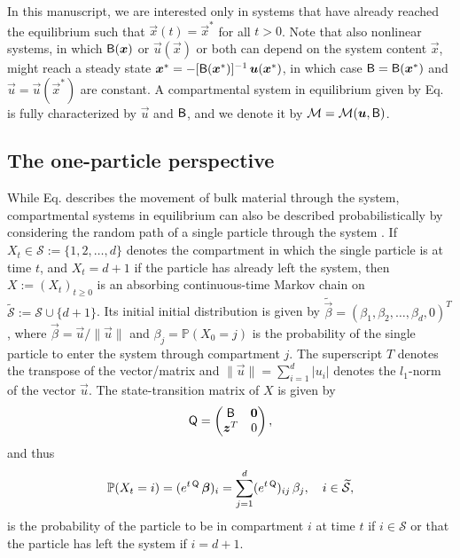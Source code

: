 \documentclass[smallextended]{svjour3}
\makeatletter
\renewcommand*{\eqref}[1]{%
  \hyperref[{#1}]{\textup{\tagform@{\ref*{#1}}}}%
}
\renewcommand{\P}{\mathbb{P}}
\newcommand{\suml}{\sum\limits}
\newcommand{\vnorms}[1]{\|#1\|}
\makeatother
\begin{document}
In this manuscript, we are interested only in systems that have already reached the equilibrium such that $\vec{x}(t)=\vec{x}^\ast$ for all $t>0$.
Note that also nonlinear systems, in which $\tens{B}(\vec{x})$ or $\vec{u}(\vec{x})$ or both can depend on the system content $\vec{x}$, might reach a steady state $\vec{x}^\ast = -[\tens{B}(\vec{x}^\ast)]^{-1}\,\vec{u}(\vec{x}^\ast)$, in which case $\tens{B}=\tens{B}(\vec{x}^\ast)$ and $\vec{u}=\vec{u}(\vec{x}^\ast)$ are constant.
A compartmental system in equilibrium given by Eq. \eqref{eqn:lin_CS_sys} is fully characterized by $\vec{u}$ and $\mathsf{B}$, and we denote it by $\mathcal{M}=\mathcal{M}(\vec{u},\tens{B})$.


\subsection{The one-particle perspective}
\label{sec:the_one_particle_perspective}
While Eq. \eqref{eqn:lin_CS_sys} describes the movement of bulk material through the system, compartmental systems in equilibrium can also be described probabilistically by considering the random path of a single particle through the system \citep{Metzler2018MGS}.
If $X_t\in\mathcal{S}:=\{1,2,\ldots,d\}$ denotes the compartment in which the single particle is at time $t$, and $X_t=d+1$ if the particle has already left the system, then $X:=(X_t)_{t\geq0}$ is an absorbing continuous-time Markov chain \citep{Norris1997} on $\widetilde{\mathcal{S}}:=\mathcal{S}\cup\{d+1\}$.
Its initial initial distribution is given by $\widetilde{\vec{\beta}}=(\beta_1, \beta_2, \ldots, \beta_d, 0)^T$, where $\vec{\beta}=\vec{u}/\vnorms{\vec{u}}$ and $\beta_j=\P(X_0=j)$ is the probability of the single particle to enter the system through compartment $j$.
The superscript $T$ denotes the transpose of the vector/matrix  and $\vnorms{\vec{u}}=\sum_{i=1}^d |u_i|$ denotes the $l_1$-norm of the vector $\vec{u}$.
The state-transition matrix of $X$ is given by
\begin{equation}\label{eqn:Q}
  \tens{Q} =
  \begin{pmatrix}
    \tens{B} & \vec{0} \\
    \vec{z}^T & 0
  \end{pmatrix},
\end{equation}
and thus
\begin{equation*}
  \P(X_t=i) = (e^{t\,\tens{Q}}\,\vec{\beta})_i = \suml_{j=1}^d (e^{t\,\tens{Q}})_{ij}\,\beta_j, \quad i\in\widetilde{\mathcal{S}},
\end{equation*}
is the probability of the particle to be in compartment $i$ at time $t$ if $i\in\mathcal{S}$ or that the particle has left the system if $i=d+1$.
\end{document}
